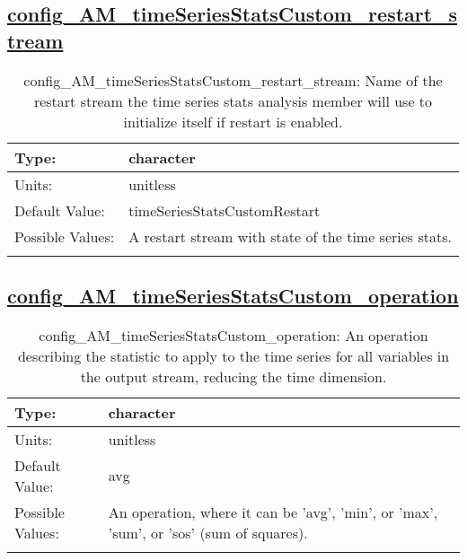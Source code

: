 \subsection[config\_AM\_timeSeriesStatsCustom\_restart\_stream]{\hyperref[sec:nm_tab_AM_timeSeriesStatsCustom]{config\_AM\_timeSeriesStatsCustom\_restart\_stream}}
\label{subsec:nm_sec_config_AM_timeSeriesStatsCustom_restart_stream}
\begin{center}
\begin{longtable}{| p{2.0in} || p{4.0in} |}
    \hline
    Type: & character \\
    \hline
    Units: & \si{unitless} \\
    \hline
    Default Value: & timeSeriesStatsCustomRestart \\
    \hline
    Possible Values: & A restart stream with state of the time series stats. \\
    \hline
    \caption{config\_AM\_timeSeriesStatsCustom\_restart\_stream: Name of the restart stream the time series stats analysis member will use to initialize itself if restart is enabled.}
\end{longtable}
\end{center}
\subsection[config\_AM\_timeSeriesStatsCustom\_operation]{\hyperref[sec:nm_tab_AM_timeSeriesStatsCustom]{config\_AM\_timeSeriesStatsCustom\_operation}}
\label{subsec:nm_sec_config_AM_timeSeriesStatsCustom_operation}
\begin{center}
\begin{longtable}{| p{2.0in} || p{4.0in} |}
    \hline
    Type: & character \\
    \hline
    Units: & \si{unitless} \\
    \hline
    Default Value: & avg \\
    \hline
    Possible Values: & An operation, where it can be 'avg', 'min', or 'max', 'sum', or 'sos' (sum of squares). \\
    \hline
    \caption{config\_AM\_timeSeriesStatsCustom\_operation: An operation describing the statistic to apply to the time series for all variables in the output stream, reducing the time dimension.}
\end{longtable}
\end{center}
